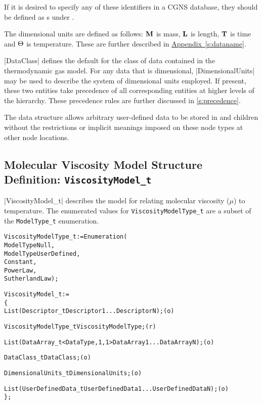 If it is desired to specify any of these identifiers in a CGNS database,
they should be defined as s under .

The dimensional units are defined as follows: ${\bf M}$ is mass, ${\bf L}$ is length,
${\bf T}$ is time and ${\Theta}$ is temperature.  These are further
described in \hyperref[s:dataname]{Appendix~\ref*{s:dataname}}.

|DataClass| defines the default for the class of data contained in the
thermodynamic gas model.  For any data that is dimensional,
|DimensionalUnits| may be used to describe the system of dimensional units
employed.  If present, these two entities take precedence of all
corresponding entities at higher levels of the hierarchy.
These precedence rules are further discussed in \autoref{s:precedence}.

The  data structure allows arbitrary
user-defined data to be stored in  and
 children without the restrictions or implicit
meanings imposed on these node types at other node locations.

\subsection{Molecular Viscosity Model Structure Definition: \texttt{ViscosityModel\_t}} 

|ViscosityModel_t| describes the model for relating molecular
viscosity ($\mu$) to temperature.
The enumerated values for \texttt{ViscosityModelType\_t} are a subset of the
\texttt{ModelType\_t} enumeration.
\begin{alltt}
  ViscosityModelType\_t := Enumeration(
    ModelTypeNull,
    ModelTypeUserDefined,
    Constant,
    PowerLaw,
    SutherlandLaw ) ;

  ViscosityModel\_t :=
    \{
    List( Descriptor\_t Descriptor1 ... DescriptorN ) ;                      (o)

    ViscosityModelType\_t ViscosityModelType ;                               (r)
    
    List( DataArray\_t<DataType, 1, 1> DataArray1 ... DataArrayN ) ;         (o)

    DataClass\_t DataClass ;                                                 (o)
                
    DimensionalUnits\_t DimensionalUnits ;                                   (o)

    List( UserDefinedData\_t UserDefinedData1 ... UserDefinedDataN ) ;       (o)
    \} ;
\end{alltt}

